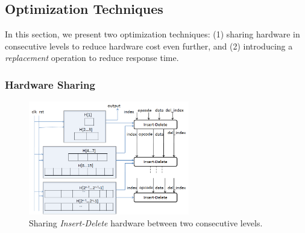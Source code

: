 \subsection{Optimization Techniques}
%

In this section, we present two optimization techniques: (1) sharing hardware in consecutive levels to reduce hardware cost even further, and (2) introducing a {\it replacement} operation to reduce response time.

\subsubsection{Hardware Sharing}
\begin{figure}[!ht]
  \centering
  \includegraphics[width=7cm]{fig/d3.png}
      \caption{Sharing {\it Insert-Delete} hardware between two consecutive levels.}
    \label{d3}
\end{figure}

